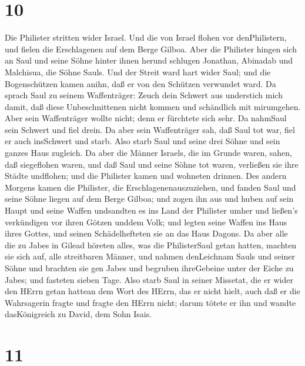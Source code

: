 \hypertarget{section-9}{%
\section{10}\label{section-9}}

 Die Philister stritten wider Israel. Und die von Israel
flohen vor denPhilistern, und fielen die Erschlagenen auf dem Berge
Gilboa.  Aber die Philister hingen sich an Saul und seine
Söhne hinter ihnen herund schlugen Jonathan, Abinadab und Malchisua, die
Söhne Sauls.  Und der Streit ward hart wider Saul; und die
Bogenschützen kamen anihn, daß er von den Schützen verwundet ward.
 Da sprach Saul zu seinem Waffenträger: Zeuch dein Schwert
aus understich mich damit, daß diese Unbeschnittenen nicht kommen und
schändlich mit mirumgehen. Aber sein Waffenträger wollte nicht; denn er
fürchtete sich sehr. Da nahmSaul sein Schwert und fiel drein.
 Da aber sein Waffenträger sah, daß Saul tot war, fiel er
auch insSchwert und starb.  Also starb Saul und seine drei
Söhne und sein ganzes Haus zugleich.  Da aber die Männer
Israels, die im Grunde waren, sahen, daß siegeflohen waren, und daß Saul
und seine Söhne tot waren, verließen sie ihre Städte undflohen; und die
Philister kamen und wohneten drinnen.  Des andern Morgens
kamen die Philister, die Erschlagenenauszuziehen, und fanden Saul und
seine Söhne liegen auf dem Berge Gilboa;  und zogen ihn aus
und huben auf sein Haupt und seine Waffen undsandten es ins Land der
Philister umher und ließen's verkündigen vor ihren Götzen unddem Volk;
 und legten seine Waffen ins Haus ihres Gottes, und seinen
Schädelhefteten sie an das Haus Dagons.  Da aber alle die
zu Jabes in Gilead höreten alles, was die PhilisterSaul getan hatten,
 machten sie sich auf, alle streitbaren Männer, und nahmen
denLeichnam Sauls und seiner Söhne und brachten sie gen Jabes und
begruben ihreGebeine unter der Eiche zu Jabes; und fasteten sieben Tage.
 Also starb Saul in seiner Missetat, die er wider den HErrn
getan hattean dem Wort des HErrn, das er nicht hielt, auch daß er die
Wahrsagerin fragte  und fragte den HErrn nicht; darum
tötete er ihn und wandte dasKönigreich zu David, dem Sohn Isais.

\hypertarget{section-10}{%
\section{11}\label{section-10}}

